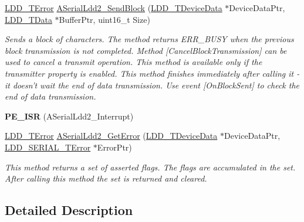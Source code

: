 \begin{DoxyCompactItemize}
\hyperlink{group___p_e___types__module_ga24c2b045fd04e79e85f261ce4df35588}{L\-D\-D\-\_\-\-T\-Error} \hyperlink{group___a_serial_ldd2__module_gabd167598efd957d04eb9bdd2e51ae673}{A\-Serial\-Ldd2\-\_\-\-Send\-Block} (\hyperlink{group___p_e___types__module_gac5cf1362f1f0e3a2ce71b1bf2276d091}{L\-D\-D\-\_\-\-T\-Device\-Data} $\ast$Device\-Data\-Ptr, \hyperlink{group___p_e___types__module_gade8ef9401405bd941b6da738b807f980}{L\-D\-D\-\_\-\-T\-Data} $\ast$Buffer\-Ptr, uint16\-\_\-t Size)
\begin{DoxyCompactList}\small\item\em Sends a block of characters. The method returns E\-R\-R\-\_\-\-B\-U\-S\-Y when the previous block transmission is not completed. Method \mbox{[}Cancel\-Block\-Transmission\mbox{]} can be used to cancel a transmit operation. This method is available only if the transmitter property is enabled. This method finishes immediately after calling it -\/ it doesn't wait the end of data transmission. Use event \mbox{[}On\-Block\-Sent\mbox{]} to check the end of data transmission. \end{DoxyCompactList}\item 
\hypertarget{group___a_serial_ldd2__module_ga8de88a30826abcdb10eeab68cc30bb09}{{\bfseries P\-E\-\_\-\-I\-S\-R} (A\-Serial\-Ldd2\-\_\-\-Interrupt)}\label{group___a_serial_ldd2__module_ga8de88a30826abcdb10eeab68cc30bb09}

\item 
\hyperlink{group___p_e___types__module_ga24c2b045fd04e79e85f261ce4df35588}{L\-D\-D\-\_\-\-T\-Error} \hyperlink{group___a_serial_ldd2__module_gafab1fb38c1ca4d64933a973a271ad7b0}{A\-Serial\-Ldd2\-\_\-\-Get\-Error} (\hyperlink{group___p_e___types__module_gac5cf1362f1f0e3a2ce71b1bf2276d091}{L\-D\-D\-\_\-\-T\-Device\-Data} $\ast$Device\-Data\-Ptr, \hyperlink{group___p_e___types__module_ga3bd5d57e02458ce220540d0ad0462e06}{L\-D\-D\-\_\-\-S\-E\-R\-I\-A\-L\-\_\-\-T\-Error} $\ast$Error\-Ptr)
\begin{DoxyCompactList}\small\item\em This method returns a set of asserted flags. The flags are accumulated in the set. After calling this method the set is returned and cleared. \end{DoxyCompactList}\end{DoxyCompactItemize}


\subsection{Detailed Description}


